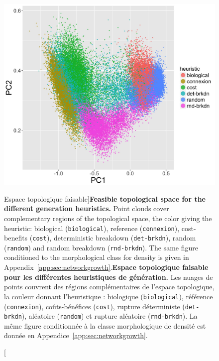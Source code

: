\begin{figure}
\includegraphics[width=\linewidth]{Figures/Final/7-1-2-fig-networkgrowth-feasiblespace.jpg}
\caption[Feasible topological space][Espace topologique faisable]{\textbf{Feasible topological space for the different generation heuristics.} Point clouds cover complementary regions of the topological space, the color giving the heuristic: biological (\texttt{biological}), reference (\texttt{connexion}), cost-benefits (\texttt{cost}), deterministic breakdown (\texttt{det-brkdn}), random (\texttt{random}) and random breakdown (\texttt{rnd-brkdn}). The same figure conditioned to the morphological class for density is given in Appendix~\ref{app:sec:networkgrowth}.\label{fig:networkgrowth:feasiblespace}}{\textbf{Espace topologique faisable pour les différentes heuristiques de génération.} Les nuages de points couvrent des régions complémentaires de l'espace topologique, la couleur donnant l'heuristique : biologique (\texttt{biological}), référence (\texttt{connexion}), coûts-bénéfices (\texttt{cost}), rupture déterministe (\texttt{det-brkdn}), aléatoire (\texttt{random}) et rupture aléatoire (\texttt{rnd-brkdn}). La même figure conditionnée à la classe morphologique de densité est donnée en Appendice~\ref{app:sec:networkgrowth}.\label{fig:networkgrowth:feasiblespace}}
\end{figure}

